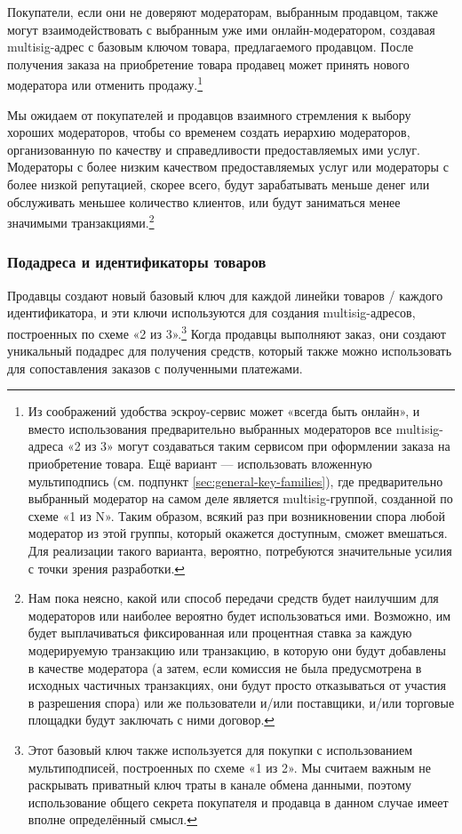 Покупатели, если они не доверяют модераторам, выбранным продавцом, также могут взаимо\-действовать с выбранным уже ими онлайн-модератором, создавая multisig-адрес с базовым ключом товара, предлагаемого продавцом. После получения заказа на приобретение товара продавец может принять нового модератора или отменить продажу.\footnote{Из соображений удобства эскроу-сервис может «всегда быть онлайн», и вместо использования предварительно выбранных модераторов все multisig-адреса «2 из 3» могут создаваться таким сервисом при оформлении заказа на приобретение товара. Ещё вариант — использовать вложенную мультиподпись (см. подпункт \ref{sec:general-key-families}), где предварительно выбранный модератор на самом деле является multisig-группой, созданной по схеме «1 из N». Таким образом, всякий раз при возникновении спора любой модератор из этой группы, который окажется доступным, сможет вмешаться. Для реализации такого варианта, вероятно, потребуются значительные усилия с точки зрения разработки.}

Мы ожидаем от покупателей и продавцов взаимного стремления к выбору хороших модерато\-ров, чтобы со временем создать иерархию модераторов, организованную по качеству и спра\-ведливости предоставляемых ими услуг. Модераторы с более низким качеством предоставляе\-мых услуг или модераторы с более низкой репутацией, скорее всего, будут зарабатывать меньше денег или обслуживать меньшее количество клиентов, или будут заниматься менее значимыми транзакциями.\footnote{Нам пока неясно, какой или способ передачи средств будет наилучшим для модераторов или наиболее вероятно будет использоваться ими. Возможно, им будет выплачиваться фиксированная или процентная ставка за каждую модерируемую транзакцию или транзакцию, в которую они будут добавлены в качестве модератора (а затем, если комиссия не была предусмотрена в исходных частичных транзакциях, они будут просто отказываться от участия в разрешения спора) или же пользователи и/или поставщики, и/или торговые площадки будут заключать с ними договор.}

\subsubsection*{Подадреса и идентификаторы товаров}

Продавцы создают новый базовый ключ для каждой линейки товаров / каждого идентифика\-тора, и эти ключи используются для создания multisig-адресов, построенных по схеме «2 из 3».\footnote{Этот базовый ключ также используется для покупки с использованием мультиподписей, построенных по схеме «1 из 2». Мы считаем важным не раскрывать приватный ключ траты в канале обмена данными, поэтому использование общего секрета покупателя и продавца в данном случае имеет вполне определённый смысл.} Когда продавцы выполняют заказ, они создают уникальный подадрес для получения средств, который также можно использовать для сопоставления заказов с полученными пла\-тежами.

